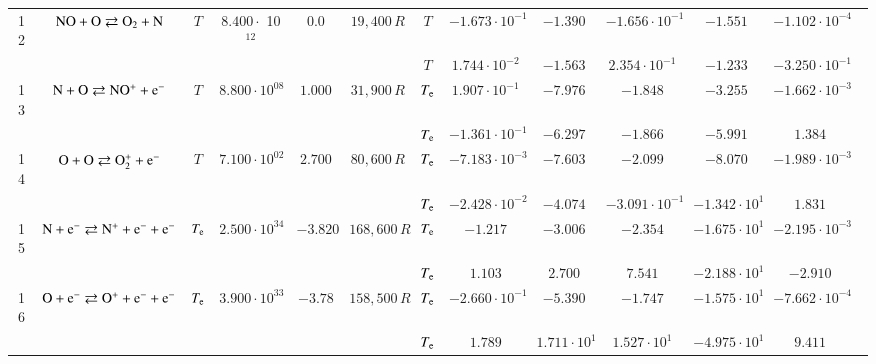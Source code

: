 \documentclass{warpdoc}
\begin{document}
\begin{table}[!ht]
\begin{center}
\begin{threeparttable}
\begin{tabular}{ccccccccccccc}
                                          
12 & $\rm NO + O \rightleftarrows O_2+N$ &$T$ &  $8.400\cdot$ 10$^{12}$ & $0.0$ & $19,400\, R$ 
                                          &$T$  & $-1.673 \cdot 10^{-1}$  & $-1.390$  & $-1.656 \cdot 10^{-1}$ & $-1.551$ & $-1.102 \cdot 10^{-4}$ & \multirow{2}{*}{\cite{jcp:1997:bose,ijhmt:2021:kim}} \\
 & & & & &                                &$T$  & $1.744 \cdot 10^{-2}$  & $-1.563$  & $2.354 \cdot 10^{-1}$ & $-1.233$ & $-3.250 \cdot 10^{-1}$ & ~ \\
 
                                          
13 & $\rm N + O \rightleftarrows NO^{+}+e^-$ &$T$ & $8.800 \cdot 10^{08}$ & $1.000$ & $31,900 \, R$ 
                                          &$T_{\rm e}$  & $1.907 \cdot 10^{-1}$  & $-7.976$  & $-1.848$ & $-3.255$ & $-1.662 \cdot 10^{-3}$ & \multirow{2}{*}{\cite{jtht:1993:park,ijhmt:2021:kim}} \\
 & & & & &                                &$T_{\rm e}$  & $-1.361 \cdot 10^{-1}$  & $-6.297$  & $-1.866$ & $-5.991$ & $1.384$ & ~ \\
 
                                          
14 & $\rm O + O \rightleftarrows O_2^{+}+e^-$ &$T$ & $7.100 \cdot 10^{02}$ & $2.700$ & $80,600\, R$ 
                                          &$T_{\rm e}$  & $-7.183 \cdot 10^{-3}$  & $-7.603$  & $-2.099$ & $-8.070$ & $-1.989 \cdot 10^{-3}$ & \multirow{2}{*}{\cite{jtht:1993:park,ijhmt:2021:kim}} \\
 & & & & &                                &$T_{\rm e}$  & $-2.428 \cdot 10^{-2}$  & $-4.074$  & $-3.091 \cdot 10^{-1}$ & $-1.342 \cdot 10^{1}$ & $1.831$ & ~ \\
 
                                          
15 & $\rm N + e^- \rightleftarrows N^{+}+e^{-}+e^{-}$ &$T_{\rm e}$ & $2.500 \cdot 10^{34}$ & $-3.820$ & $168,600 \, R$ 
                                          &$T_{\rm e}$  & $-1.217$  & $-3.006$  & $-2.354$ & $-1.675 \cdot 10^{1}$ & $-2.195 \cdot 10^{-3}$ & \multirow{2}{*}{\cite{book:1990:park,ijhmt:2021:kim}} \\
 & & & & &                                &$T_{\rm e}$  & $1.103$  & $2.700$  & $7.541$ & $-2.188 \cdot 10^{1}$ & $-2.910$ & ~ \\
 
                                          
16 & $\rm O + e^- \rightleftarrows O^{+}+e^{-}+e^{-}$ &$T_{\rm e}$ & $3.900 \cdot 10^{33}$ & $-3.78$ & $158,500\, R$ 
                                          &$T_{\rm e}$  & $-2.660 \cdot 10^{-1}$  & $-5.390$  & $-1.747$ & $-1.575 \cdot 10^{1}$ & $-7.662 \cdot 10^{-4}$ & \multirow{2}{*}{\cite{book:1990:park,ijhmt:2021:kim}} \\
 & & & & &                                &$T_{\rm e}$  & $1.789$  & $1.711 \cdot 10^{1}$  & $1.527 \cdot 10^{1}$ & $-4.975 \cdot 10^{1}$ & $9.411$ & ~ \\
 

\end{tabular}
\end{threeparttable}
\end{center}
\end{table}
\end{document}
